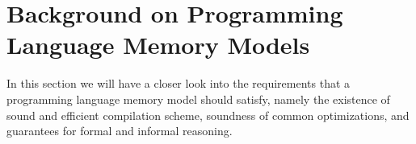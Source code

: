 \section{Background on Programming Language Memory Models}

In this section we will have a closer look into the requirements 
that a programming language memory model should satisfy, 
namely the existence of sound and efficient compilation scheme, 
soundness of common optimizations, and guarantees for formal and informal reasoning.  










